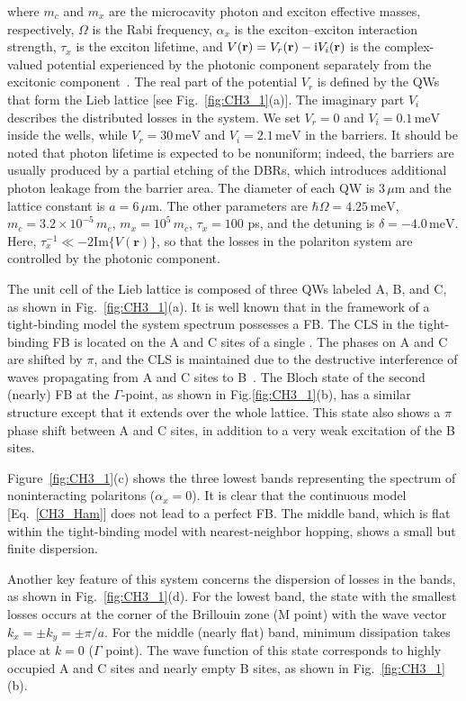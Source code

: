 where $m_c$ and $m_x$ are the microcavity photon and exciton effective masses, respectively, $\Omega$ is the Rabi frequency, $\alpha_x$ is the exciton--exciton interaction strength, $\tau_x$ is the exciton lifetime, and $V(\mathbf{r})=V_r(\mathbf{r})-{\mathrm{i}}V_i(\mathbf{r})$ is the complex-valued potential experienced by the photonic component separately from the excitonic component~\cite{Sun:2017ab}.
The real part of the potential $V_r$ is defined by the QWs that form the Lieb lattice [see Fig.~\ref{fig:CH3_1}(a)]. The imaginary part $V_i$ describes the distributed losses in the system.
We set $V_r=0$ and $V_i=0.1\,\mathrm{meV}$ inside the wells, while  $V_r=30\,\mathrm{meV}$ and $V_i=2.1\,\mathrm{meV}$ in the barriers.
It should be noted that photon lifetime is expected to be nonuniform; indeed, the barriers are usually produced by a partial etching of the DBRs, which introduces additional photon leakage from the barrier area.
The diameter of each QW is $3\,\mu\mathrm{m}$ and the lattice constant is $a=6\,\mu\mathrm{m}$.
The other parameters are $\hbar\Omega=4.25\,\mathrm{meV}$, $m_c=3.2\times10^{-5}\,m_e$, $m_x=10^5\,m_c$, $\tau_x=100$ ps, and the detuning is $\delta=-4.0\,\mathrm{meV}$.
Here, $\tau_x^{-1}\ll-2\mathrm{Im}\{V(\mathbf{r})\}$, so that the losses in the polariton system are controlled by the photonic component.

The unit cell of the Lieb lattice is composed of three QWs labeled A, B, and C, as shown in Fig.~\ref{fig:CH3_1}(a).
It is well known that in the framework of a tight-binding model the system spectrum possesses a FB.
The CLS in the tight-binding FB is located on the A and C sites of a single .
The phases on A and C are shifted by $\pi$, and the CLS is maintained due to the destructive interference of waves propagating from A and C sites to B~\cite{Vicencio:2015aa}.
The Bloch state of the second (nearly) FB at the $\Gamma$-point, as shown in Fig.\ref{fig:CH3_1}(b), has a similar structure except that it extends over the whole lattice.
This state also shows a $\pi$ phase shift between A and C sites, in addition to a very weak excitation of the B sites.

Figure~\ref{fig:CH3_1}(c) shows the three lowest bands representing the spectrum of noninteracting polaritons ($\alpha_x=0$).
It is clear that the continuous model [Eq.~\eqref{CH3_Ham}] does not lead to a perfect FB.
The middle band, which is flat within the tight-binding model with nearest-neighbor hopping, shows a small but finite dispersion.

Another key feature of this system concerns the dispersion of losses in the bands, as shown in Fig.~\ref{fig:CH3_1}(d).
For the lowest band, the state with the smallest losses occurs at the corner of the Brillouin zone (M point) with the wave vector $k_x={\pm}k_y={\pm}\pi/a$.
For the middle (nearly flat) band, minimum dissipation takes place at $k=0$ ($\Gamma$ point).
The wave function of this state corresponds to highly occupied A and C sites and nearly empty B sites, as shown in Fig.~\ref{fig:CH3_1}(b).

